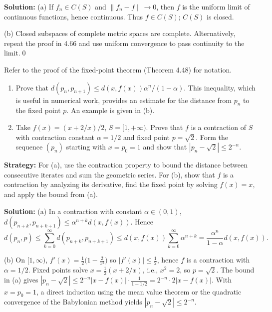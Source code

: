 \bigskip\noindent\textbf{Solution:}
(a) If $f_n\in C(S)$ and $\|f_n-f\|\to 0$, then $f$ is the uniform limit of continuous functions, hence continuous. Thus $f\in C(S)$; $C(S)$ is closed.

(b) Closed subspaces of complete metric spaces are complete. Alternatively, repeat the proof in 4.66 and use uniform convergence to pass continuity to the limit.\qed



\begin{problembox}
Refer to the proof of the fixed-point theorem (Theorem 4.48) for notation.
\begin{enumerate}[label=(\alph*)]
\item Prove that $d(p_n, p_{n+1}) \leq d(x, f(x)) \alpha^n / (1 - \alpha)$. This inequality, which is useful in numerical work, provides an estimate for the distance from $p_n$ to the fixed point $p$. An example is given in (b).
\item Take $f(x) = (x + 2/x)/2$, $S = [1, +\infty)$. Prove that $f$ is a contraction of $S$ with contraction constant $\alpha = 1/2$ and fixed point $p = \sqrt{2}$. Form the sequence $(p_n)$ starting with $x=p_0=1$ and show that $|p_n - \sqrt{2}| \le 2^{-n}$.
\end{enumerate}
\end{problembox}

\noindent\textbf{Strategy:} For (a), use the contraction property to bound the distance between consecutive iterates and sum the geometric series. For (b), show that $f$ is a contraction by analyzing its derivative, find the fixed point by solving $f(x) = x$, and apply the bound from (a).

\bigskip\noindent\textbf{Solution:}
(a) In a contraction with constant $\alpha\in(0,1)$, $d(p_{n+k},p_{n+k+1})\le \alpha^{n+k}d(x,f(x))$. Hence
\[
d(p_n,p)\le \sum_{k=0}^{\infty} d(p_{n+k},p_{n+k+1})\le d(x,f(x))\sum_{k=0}^{\infty}\alpha^{n+k}=\frac{\alpha^n}{1-\alpha}d(x,f(x)).
\]

(b) On $[1,\infty)$, $f'(x)=\tfrac12\big(1-\tfrac{2}{x^2}\big)$ so $|f'(x)|\le \tfrac12$, hence $f$ is a contraction with $\alpha=1/2$. Fixed points solve $x=\tfrac12(x+2/x)$, i.e., $x^2=2$, so $p=\sqrt2$. The bound in (a) gives $|p_n-\sqrt2|\le 2^{-n}|x-f(x)|\cdot\tfrac{1}{1-1/2}=2^{-n}\cdot 2|x-f(x)|$. With $x=p_0=1$, a direct induction using the mean value theorem or the quadratic convergence of the Babylonian method yields $|p_n-\sqrt2|\le 2^{-n}$.

